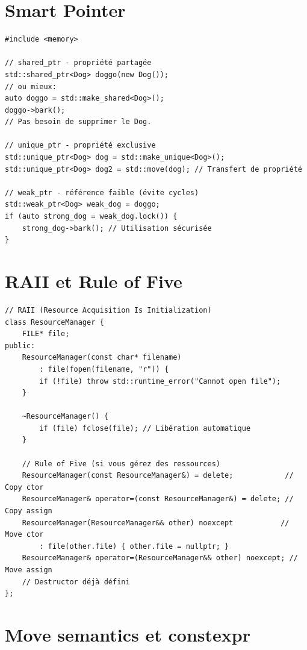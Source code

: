 \documentclass{article}
\begin{document}
\begin{multicols*}{3}
    \section*{Smart Pointer}

    \begin{lstlisting}
#include <memory>

// shared_ptr - propriété partagée
std::shared_ptr<Dog> doggo(new Dog());
// ou mieux:
auto doggo = std::make_shared<Dog>();
doggo->bark();
// Pas besoin de supprimer le Dog.

// unique_ptr - propriété exclusive
std::unique_ptr<Dog> dog = std::make_unique<Dog>();
std::unique_ptr<Dog> dog2 = std::move(dog); // Transfert de propriété

// weak_ptr - référence faible (évite cycles)
std::weak_ptr<Dog> weak_dog = doggo;
if (auto strong_dog = weak_dog.lock()) {
    strong_dog->bark(); // Utilisation sécurisée
}

\end{lstlisting}

    \section*{RAII et Rule of Five}

    \begin{lstlisting}
// RAII (Resource Acquisition Is Initialization)
class ResourceManager {
    FILE* file;
public:
    ResourceManager(const char* filename) 
        : file(fopen(filename, "r")) {
        if (!file) throw std::runtime_error("Cannot open file");
    }
    
    ~ResourceManager() { 
        if (file) fclose(file); // Libération automatique
    }
    
    // Rule of Five (si vous gérez des ressources)
    ResourceManager(const ResourceManager&) = delete;            // Copy ctor
    ResourceManager& operator=(const ResourceManager&) = delete; // Copy assign
    ResourceManager(ResourceManager&& other) noexcept           // Move ctor
        : file(other.file) { other.file = nullptr; }
    ResourceManager& operator=(ResourceManager&& other) noexcept; // Move assign
    // Destructor déjà défini
};

\end{lstlisting}

    \section*{Move semantics et constexpr}


\end{multicols*}
\end{document}
